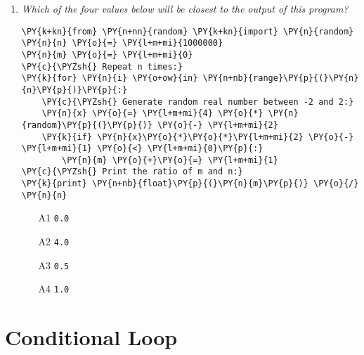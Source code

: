 \begin{enumerate}
\vspace{6mm}

\item {\em Which of the four values below will be closest to the output of this program?}\\

\begin{Verbatim}[commandchars=\\\{\}]
\PY{k+kn}{from} \PY{n+nn}{random} \PY{k+kn}{import} \PY{n}{random}
\PY{n}{n} \PY{o}{=} \PY{l+m+mi}{1000000}
\PY{n}{m} \PY{o}{=} \PY{l+m+mi}{0}
\PY{c}{\PYZsh{} Repeat n times:}
\PY{k}{for} \PY{n}{i} \PY{o+ow}{in} \PY{n+nb}{range}\PY{p}{(}\PY{n}{n}\PY{p}{)}\PY{p}{:}
    \PY{c}{\PYZsh{} Generate random real number between -2 and 2:}
    \PY{n}{x} \PY{o}{=} \PY{l+m+mi}{4} \PY{o}{*} \PY{n}{random}\PY{p}{(}\PY{p}{)} \PY{o}{-} \PY{l+m+mi}{2}
    \PY{k}{if} \PY{n}{x}\PY{o}{*}\PY{o}{*}\PY{l+m+mi}{2} \PY{o}{-} \PY{l+m+mi}{1} \PY{o}{<} \PY{l+m+mi}{0}\PY{p}{:}
        \PY{n}{m} \PY{o}{+}\PY{o}{=} \PY{l+m+mi}{1}
\PY{c}{\PYZsh{} Print the ratio of m and n:}
\PY{k}{print} \PY{n+nb}{float}\PY{p}{(}\PY{n}{m}\PY{p}{)} \PY{o}{/} \PY{n}{n} 
\end{Verbatim}
\vspace{6mm}

\begin{enumerate}
\item[A1] {\tt 0.0}
\item[A2] {\tt 4.0}
\item[A3] {\tt 0.5}
\item[A4] {\tt 1.0}
\end{enumerate}

\vspace{6mm}

\end{enumerate}


\section{Conditional Loop}

